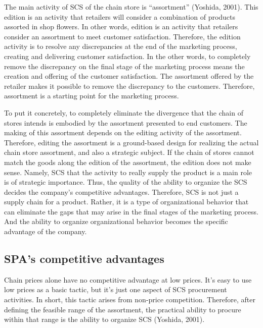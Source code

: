 \documentclass[12pt,a4paper]{article}
\begin{document}
The main activity of SCS of the chain store is ``assortment'' (Yoshida,
2001). This edition is an activity that retailers will consider a
combination of products assorted in shop flowers. In other words,
edition is an activity that retailers consider an assortment to meet
customer satisfaction. Therefore, the edition activity is to resolve any
discrepancies at the end of the marketing process, creating and
delivering customer satisfaction. In the other words, to completely
remove the discrepancy on the final stage of the marketing process means
the creation and offering of the customer satisfaction. The assortment
offered by the retailer makes it possible to remove the discrepancy to
the customers. Therefore, assortment is a starting point for the
marketing process.

To put it concretely, to completely eliminate the divergence that the
chain of stores intends is embodied by the assortment presented to end
customers. The making of this assortment depends on the editing activity
of the assortment. Therefore, editing the assortment is a ground-based
design for realizing the actual chain store assortment, and also a
strategic subject. If the chain of stores cannot match the goods along
the edition of the assortment, the edition does not make sense. Namely,
SCS that the activity to really supply the product is a main role is of
strategic importance. Thus, the quality of the ability to organize the
SCS decides the company's competitive advantages. Therefore, SCS is not
just a supply chain for a product. Rather, it is a type of
organizational behavior that can eliminate the gaps that may arise in
the final stages of the marketing process. And the ability to organize
organizational behavior becomes the specific advantage of the company.

\hypertarget{spas-competitive-advantages}{%
\subsection{SPA's competitive
advantages}\label{spas-competitive-advantages}}

Chain prices alone have no competitive advantage at low prices. It's
easy to use low prices as a basic tactic, but it's just one aspect of
SCS procurement activities. In short, this tactic arises from non-price
competition. Therefore, after defining the feasible range of the
assortment, the practical ability to procure within that range is the
ability to organize SCS (Yoshida, 2001).
\end{document}
